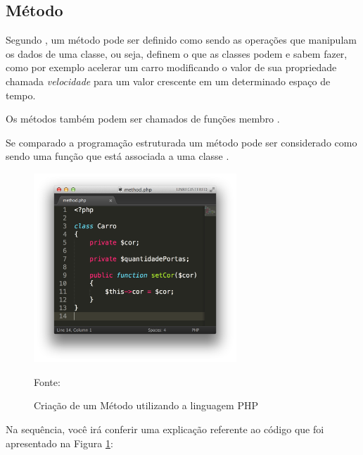 \subsection{Método}

Segundo , um
método pode ser definido como sendo as operações que manipulam os dados de uma
classe, ou seja, definem o que as classes podem e sabem fazer, como por exemplo
acelerar um carro modificando o valor de sua propriedade chamada
\textit{velocidade} para um valor crescente em um determinado espaço de tempo.

Os métodos também podem ser chamados de funções membro \cite{c++ComoProgramar}.

Se comparado a programação estruturada um método pode ser considerado como sendo
uma função que está associada a uma classe \cite{programmingPhp}.

\begin{figure}[h!tb]
	\caption{Criação de um Método utilizando a linguagem PHP}
	\label{fig:metodo}

	\centering
	\includegraphics[width=0.68\textwidth]{images/method.png}

	\centering
	\footnotesize Fonte: \fonteOAutor
\end{figure}

\FloatBarrier 	%

Na sequência, você irá conferir uma explicação referente ao código que foi
apresentado na Figura \ref{fig:metodo}:

